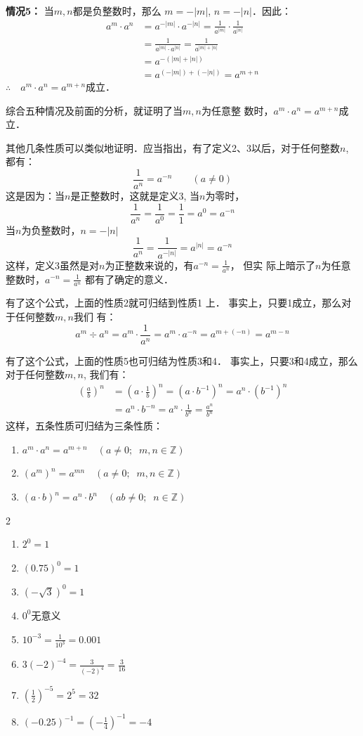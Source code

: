 \textbf{情况5：} 当$m,n$都是负整数时，那么
$m=-|m|$, $n=-|n|$．因此：
\[\begin{split}
    a^m\cdot a^n&=a^{-|m|}\cdot a^{-|n|}=\frac{1}{a^{|m|}}\cdot \frac{1}{a^{|n|}}\\
    &=\frac{1}{a^{|m|}\cdot a^{|n|}}=\frac{1}{a^{|m|+|n|}}\\
    &=a^{-(|m|+|n|)}\\
    &=a^{(-|m|)+(-|n|)}=a^{m+n}
\end{split}\]
$\therefore\quad a^m\cdot a^n=a^{m+n}$成立．

综合五种情况及前面的分析，就证明了当$m,n$为任意整
数时，$a^m\cdot a^n=a^{m+n}$成立．

其他几条性质可以类似地证明．应当指出，有了定义2、3以后，对于任何整数$n$, 都有：
\[\frac{1}{a^n}=a^{-n}\qquad (a\ne 0)\]
这是因为：当$n$是正整数时，这就是定义3, 当$n$为零时，
 \[\frac{1}{a^n}=\frac{1}{a^0}=\frac{1}{1}=a^0=a^{-n}\]
 当$n$为负整数时，$n=-|n|$
\[\frac{1}{a^n}=\frac{1}{a^{-|n|}}=a^{|n|}=a^{-n}\]
这样，定义3虽然是对$n$为正整数来说的，有$a^{-n}=\frac{1}{a^n}$，
但实
际上暗示了$n$为任意整数时，$a^{-n}=\frac{1}{a^n}$
都有了确定的意义．

有了这个公式，上面的性质2就可归结到性质1
上．
事实上，只要1成立，那么对于任何整数$m,n$我们
有：
\[a^m\div a^n=a^m\cdot \frac{1}{a^n}=a^m\cdot a^{-n}=a^{m+(-n)}=a^{m-n}\]

有了这个公式，上面的性质5也可归结为性质3和4．
事实上，只要3和4成立，那么对于任何整数$m,n$,
我们有：
\[\begin{split}
    \left(\frac{a}{b}\right)^n&=\left(a\cdot\frac{1}{b}\right)^n=(a\cdot b^{-1})^n=a^n\cdot (b^{-1})^n\\
    &=a^n \cdot b^{-n}=a^n\cdot \frac{1}{b^n}=\frac{a^n}{b^n}
\end{split}\]
这样，五条性质可归结为三条性质：
\begin{enumerate}
    \item $a^m\cdot a^n=a^{m+n}\quad (a\ne 0;\;\;m,n\in\mathbb{Z})$
    \item $(a^m)^n=a^{mn}\quad (a\ne 0;\;\;m,n\in\mathbb{Z})$
    \item $(a\cdot b)^n=a^n\cdot b^n \quad (ab\ne 0;\;\;n\in\mathbb{Z})$
\end{enumerate}


\begin{example}
\begin{multicols}{2}  
    \begin{enumerate}
        \item $2^0=1$
        \item $(0.75)^0=1$
        \item $\left(-\sqrt{3}\right)^0=1$
        \item $0^0$无意义
        \item $10^{-3}=\frac{1}{10^3}=0.001$
        \item $3(-2)^{-4}=\frac{3}{(-2)^{4}}=\frac{3}{16}$
        \item $\left(\frac{1}{2}\right)^{-5}=2^5=32$
        \item $(-0.25)^{-1}=\left(-\frac{1}{4}\right)^{-1}=-4$
    \end{enumerate}
\end{multicols}   
\end{example}

